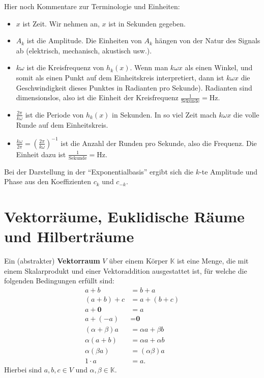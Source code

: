 \begin{bem} 
	Hier noch Kommentare zur Terminologie und Einheiten: 
	\begin{itemize}
		\item $x$ ist Zeit. Wir nehmen an, $x$ ist in Sekunden gegeben.
		\item $A_k$ ist die Amplitude. Die Einheiten von $A_k$ hängen von der Natur des Signals ab (elektrisch, mechanisch, akustisch usw.). 
		\item $k \omega$ ist die Kreisfrequenz von $h_k(x)$. Wenn man $k \omega x$ als einen Winkel, und somit als einen Punkt auf dem Einheitskreis interpretiert, dann ist $k \omega x$ die Geschwindigkeit dieses Punktes in Radianten pro Sekunde). Radianten sind dimensionslos, also ist die Einheit der Kreisfrequenz $\frac{1}{\text{Sekunde}} = \text{Hz}$.   
		\item $\frac{2 \pi}{k \omega}$ ist die Periode von $h_k(x)$ in Sekunden. In so viel Zeit  mach $k \omega x$ die volle Runde auf dem Einheitskreis. 
		\item $\frac{k \omega}{2 \pi} = (\frac{2 \pi}{k \omega})^{-1}$ ist die Anzahl der Runden pro Sekunde, also die Frequenz. Die Einheit dazu ist $\frac{1}{\text{Sekunde}} = \text{Hz}$.   
	\end{itemize}
\end{bem}  


\begin{bem}
	Bei der Darstellung in der ``Exponentialbasis'' ergibt sich die $k$-te Amplitude und Phase aus den Koeffizienten $c_k$ und $c_{-k}$. 
\end{bem} 

\section{Vektorräume,  Euklidische Räume und Hilberträume} 

\begin{defn} 
Ein (abstrakter) \textbf{Vektorraum} $V$ über einem Körper $\mathbb{K}$ ist eine Menge, die mit einem Skalarprodukt und einer Vektoraddition ausgestattet ist, für welche die folgenden Bedingungen erfüllt sind:
\begin{align*}
		a+ b & = b+ a
		\\ (a+b)+c & = a+(b+c) 
		\\ a+ \textbf{0} & = a
		\\ a + (-a) & = \textbf{0}
		\\ (\alpha + \beta) a & = \alpha a + \beta b
		\\ \alpha (a+b) & = \alpha a + \alpha b
		\\ \alpha (\beta a) & = (\alpha \beta) a
		\\ 1 \cdot a & = a. 
\end{align*} 
Hierbei sind $a,b,c \in V$ und $\alpha,\beta \in \mathbb{K}$. 
\end{defn} 

